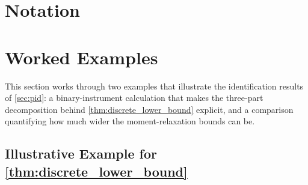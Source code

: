 %
%
%

\section{Notation}\label{sec:notation}


\section{Worked Examples}\label{oa:examples}

This section works through two examples that illustrate the identification results of \cref{sec:pid}: a binary-instrument calculation that makes the three-part decomposition behind \cref{thm:discrete_lower_bound} explicit, and a comparison quantifying how much wider the moment-relaxation bounds can be.

\subsection{Illustrative Example for \cref{thm:discrete_lower_bound}}

